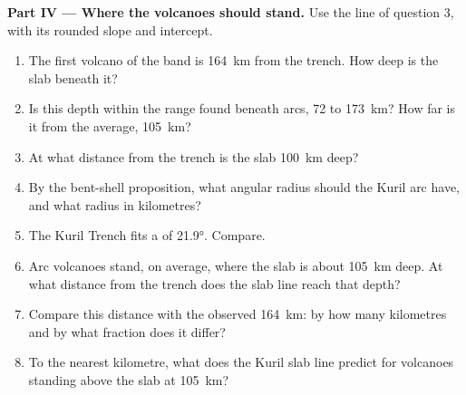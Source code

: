 \begin{problem}
\medskip
\noindent\textbf{Part IV --- Where the volcanoes should stand.} Use the line
of question 3, with its rounded slope and intercept.
\begin{enumerate}[resume]
  \item The first volcano of the band is \qty{164}{km} from the trench. How
        deep is the slab beneath it?
  \item Is this depth within the range found beneath arcs, 72 to
        \qty{173}{km}? How far is it from the average, \qty{105}{km}?
  \item At what distance from the trench is the slab \qty{100}{km} deep?
  \item By the bent-shell proposition, what angular radius should the Kuril
        arc have, and what radius in kilometres?
  \item The Kuril Trench fits a  of \ang{21.9}. Compare.
  \item Arc volcanoes stand, on average, where the slab is about
        \qty{105}{km} deep. At what distance from the trench does the slab line
        reach that depth?
  \item Compare this distance with the observed \qty{164}{km}: by how many
        kilometres and by what fraction does it differ?
  \item To the nearest kilometre, what  does the Kuril slab line
        predict for volcanoes standing above the slab at \qty{105}{km}?
\end{enumerate}
\end{problem}
